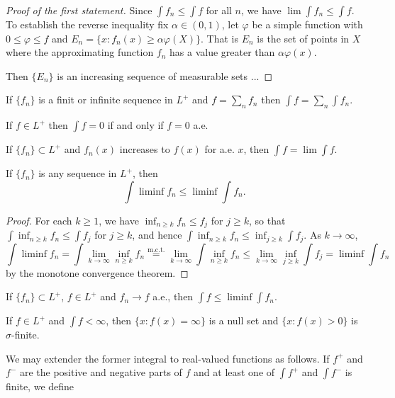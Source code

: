 \documentclass{article}
\theoremstyle{definition}
\numberwithin{equation}{section}
\begin{document}
		\begin{proof}[Proof of the first statement]
			Since $\int f_n\leq\int f$ for all $n$, we have $\lim\int f_n\leq\int f$. To establish the reverse inequality fix $\alpha\in (0,1)$, let $\varphi$ be a simple function with $0\leq\varphi\leq f$ and $E_n=\{x:f_n(x)\geq\alpha\varphi(X)\}$. That is $E_n$ is the set of points in $X$ where the approximating function $f_n$ has a value greater than $\alpha\varphi(x)$.
			
			Then $\{E_n\}$ is an increasing sequence of measurable sets {\color{orange}...}
		\end{proof}
		\begin{thm}
			If $\{f_n\}$ is a finit or infinite sequence in $L^+$ and $f=\sum_nf_n$ then $\int f=\sum_n\int f_n$.
		\end{thm}
		\begin{prop}
			If $f\in L^+$ then $\int f=0$ if and only if $f=0$ a.e.
		\end{prop}
		\begin{coro}
			If $\{f_n\}\subset L^+$ and $f_n(x)$ increases to $f(x)$ for a.e. $x$, then $\int f=\lim \int f$.
		\end{coro}
		\begin{lemma}[Fatou]
			If $\{f_n\}$ is any sequence in $L^+$, then
			\[\int\liminf f_n\leq\liminf\int f_n.\]
		\end{lemma}
		\begin{proof}
			For each $k\geq1$, we have $\inf_{n\geq k}f_n\leq f_j$ for $j\geq k$, so that $\int \inf_{n\geq k}f_n\leq\int f_j$ for $j\geq k$, and hence $\int \inf_{n\geq k}f_n\leq\inf_{j\geq k}\int f_j$. As $k\to\infty$,
			\[\int\liminf f_n=\int\lim_{k\to\infty}\inf_{n\geq k}f_n\overset{\text{m.c.t.}}{=}\lim_{k\to\infty}\int\inf_{n\geq k}f_n\leq\lim_{k\to\infty}\inf_{j\geq k}\int f_j=\liminf\int f_n\]
			by the monotone convergence theorem.
		\end{proof}
		\begin{coro}
			If $\{f_n\}\subset L^+$, $f\in L^+$ and $f_n\to f$ a.e., then $\int f\leq\liminf\int f_n$.
		\end{coro}
		\begin{prop}
			If $f\in L^+$ and $\int f<\infty$, then $\{x:f(x)=\infty\}$ is a null set and $\{x:f(x)>0\}$ is $\sigma$-finite.
		\end{prop}
		We may extender the former integral to real-valued functions as follows. If $f^+$ and $f^-$ are the positive and negative parts of $f$ and at least one of $\int f^+$ and $\int f^-$ is finite, we define
\end{document}
